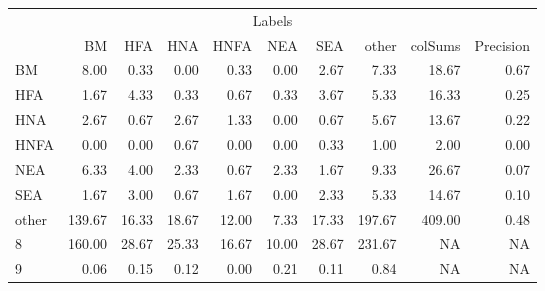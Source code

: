 \begin{table}
\centering\begingroup\fontsize{11}{13}\selectfont

\begin{tabular}{lrrrrrr>{}r|rr}
\toprule
\multicolumn{10}{c}{Labels} \\
\cmidrule(l{3pt}r{3pt}){1-10}
  & BM & HFA & HNA & HNFA & NEA & SEA & other & colSums & Precision\\
\midrule
BM & 8.00 & 0.33 & 0.00 & 0.33 & 0.00 & 2.67 & 7.33 & 18.67 & 0.67\\
HFA & 1.67 & 4.33 & 0.33 & 0.67 & 0.33 & 3.67 & 5.33 & 16.33 & 0.25\\
HNA & 2.67 & 0.67 & 2.67 & 1.33 & 0.00 & 0.67 & 5.67 & 13.67 & 0.22\\
HNFA & 0.00 & 0.00 & 0.67 & 0.00 & 0.00 & 0.33 & 1.00 & 2.00 & 0.00\\
NEA & 6.33 & 4.00 & 2.33 & 0.67 & 2.33 & 1.67 & 9.33 & 26.67 & 0.07\\
\addlinespace
SEA & 1.67 & 3.00 & 0.67 & 1.67 & 0.00 & 2.33 & 5.33 & 14.67 & 0.10\\
other & 139.67 & 16.33 & 18.67 & 12.00 & 7.33 & 17.33 & 197.67 & 409.00 & 0.48\\
8 & 160.00 & 28.67 & 25.33 & 16.67 & 10.00 & 28.67 & 231.67 & NA & NA\\
9 & 0.06 & 0.15 & 0.12 & 0.00 & 0.21 & 0.11 & 0.84 & NA & NA\\
\bottomrule
\end{tabular}
\endgroup{}
\end{table}
